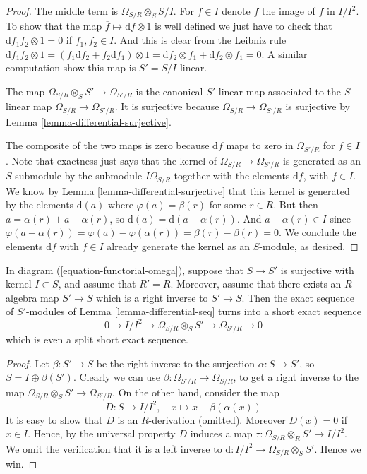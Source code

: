\begin{proof}
The middle term is $\Omega_{S/R} \otimes_S S/I$.
For $f \in I$ denote $\overline{f}$ the image of $f$ in $I/I^2$.
To show that the map $\overline{f} \mapsto \text{d}f \otimes 1$
is well defined we just have to check that
$\text{d} f_1f_2 \otimes 1 = 0$ if $f_1, f_2 \in I$.
And this is clear from the Leibniz rule
$\text{d} f_1f_2 \otimes 1
=
(f_1 \text{d}f_2 + f_2 \text{d} f_1 )\otimes 1
=
\text{d}f_2 \otimes f_1 + \text{d}f_2 \otimes f_1
=
0$. A similar computation show this map is $S' = S/I$-linear.

\medskip\noindent
The map $\Omega_{S/R}\otimes_S S' \to \Omega_{S'/R}$
is the canonical $S'$-linear map associated to the
$S$-linear map $\Omega_{S/R} \to \Omega_{S'/R}$.
It is surjective because $\Omega_{S/R} \to \Omega_{S'/R}$
is surjective by Lemma \ref{lemma-differential-surjective}.

\medskip\noindent
The composite of the two maps is zero because
$\text{d}f$ maps to zero in $\Omega_{S'/R}$
for $f \in I$. Note that exactness just says that
the kernel of $\Omega_{S/R} \to \Omega_{S'/R}$
is generated as an $S$-submodule by the submodule $I\Omega_{S/R}$ together
with the elements $\text{d}f$, with $f \in I$. We know by
Lemma \ref{lemma-differential-surjective}
that this kernel is generated by the elements $\text{d}(a)$
where $\varphi(a) = \beta(r)$ for some $r \in R$.
But then $a = \alpha(r) + a - \alpha(r)$, so
$\text{d}(a) = \text{d}(a - \alpha(r))$. And
$a - \alpha(r) \in I$ since $\varphi(a - \alpha(r)) =
\varphi(a) - \varphi(\alpha(r)) = \beta(r) - \beta(r) = 0$.
We conclude the elements $\text{d}f$ with $f \in I$ already
generate the kernel as an $S$-module, as desired.
\end{proof}

\begin{lemma}
\label{lemma-differential-seq-split}
In diagram (\ref{equation-functorial-omega}),
suppose that $S \to S'$ is surjective with kernel $I \subset S$,
and assume that $R' = R$. Moreover, assume that there exists
an $R$-algebra map $S' \to S$ which is a right inverse to
$S' \to S$. Then the exact sequence of $S'$-modules
of Lemma \ref{lemma-differential-seq} turns into a short exact sequence
$$
0 \longrightarrow
I/I^2
\longrightarrow
\Omega_{S/R}\otimes_S S'
\longrightarrow
\Omega_{S'/R}
\longrightarrow
0
$$
which is even a split short exact sequence.
\end{lemma}

\begin{proof}
Let $\beta : S' \to S$ be the right inverse to the surjection
$\alpha : S \to S'$, so $S = I \oplus \beta(S')$.
Clearly we can use $\beta : \Omega_{S'/R} \to \Omega_{S/R}$,
to get a right inverse to the map $\Omega_{S/R}\otimes_S S' \to \Omega_{S'/R}$.
On the other hand, consider the map
$$
D : S \longrightarrow I/I^2,
\quad
x \longmapsto x - \beta(\alpha(x))
$$
It is easy to show that $D$ is an $R$-derivation (omitted).
Moreover $D(x) = 0$ if $x \in I$. Hence, by the universal property
$D$ induces a map $\tau : \Omega_{S/R} \otimes_R S' \to I/I^2$.
We omit the verification that it is a left inverse to
$\text{d} : I/I^2  \to \Omega_{S/R}\otimes_S S'$. Hence we win.
\end{proof}

